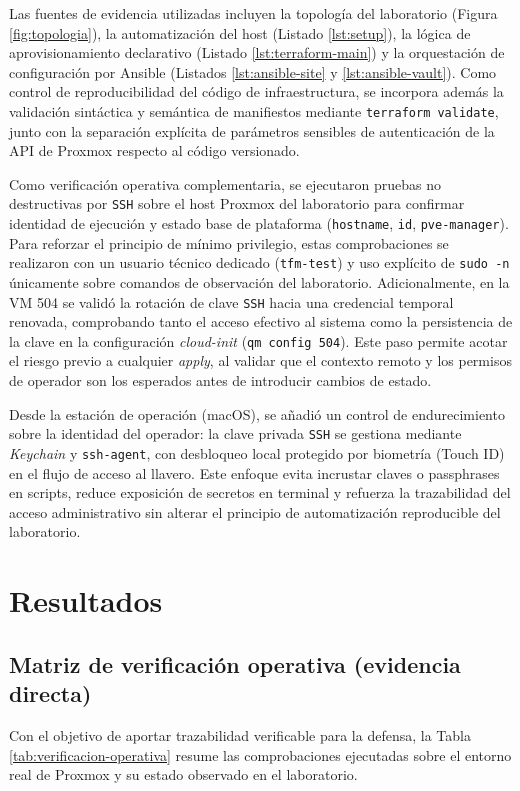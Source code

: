 \documentclass[runningheads]{llncs}
\begin{document}
Las fuentes de evidencia utilizadas incluyen la topología del laboratorio (Figura \ref{fig:topologia}), la automatización del host (Listado \ref{lst:setup}), la lógica de aprovisionamiento declarativo (Listado \ref{lst:terraform-main}) y la orquestación de configuración por Ansible (Listados \ref{lst:ansible-site} y \ref{lst:ansible-vault}). Como control de reproducibilidad del código de infraestructura, se incorpora además la validación sintáctica y semántica de manifiestos mediante \texttt{terraform validate}, junto con la separación explícita de parámetros sensibles de autenticación de la API de Proxmox respecto al código versionado.

Como verificación operativa complementaria, se ejecutaron pruebas no destructivas por \texttt{SSH} sobre el host Proxmox del laboratorio para confirmar identidad de ejecución y estado base de plataforma (\texttt{hostname}, \texttt{id}, \texttt{pve-manager}). Para reforzar el principio de mínimo privilegio, estas comprobaciones se realizaron con un usuario técnico dedicado (\texttt{tfm-test}) y uso explícito de \texttt{sudo -n} únicamente sobre comandos de observación del laboratorio. Adicionalmente, en la VM 504 se validó la rotación de clave \texttt{SSH} hacia una credencial temporal renovada, comprobando tanto el acceso efectivo al sistema como la persistencia de la clave en la configuración \textit{cloud-init} (\texttt{qm config 504}). Este paso permite acotar el riesgo previo a cualquier \textit{apply}, al validar que el contexto remoto y los permisos de operador son los esperados antes de introducir cambios de estado.

Desde la estación de operación (macOS), se añadió un control de endurecimiento sobre la identidad del operador: la clave privada \texttt{SSH} se gestiona mediante \textit{Keychain} y \texttt{ssh-agent}, con desbloqueo local protegido por biometría (Touch ID) en el flujo de acceso al llavero. Este enfoque evita incrustar claves o passphrases en scripts, reduce exposición de secretos en terminal y refuerza la trazabilidad del acceso administrativo sin alterar el principio de automatización reproducible del laboratorio.

\section{Resultados}

\subsection{Matriz de verificación operativa (evidencia directa)}
Con el objetivo de aportar trazabilidad verificable para la defensa, la Tabla \ref{tab:verificacion-operativa} resume las comprobaciones ejecutadas sobre el entorno real de Proxmox y su estado observado en el laboratorio.
\end{document}

